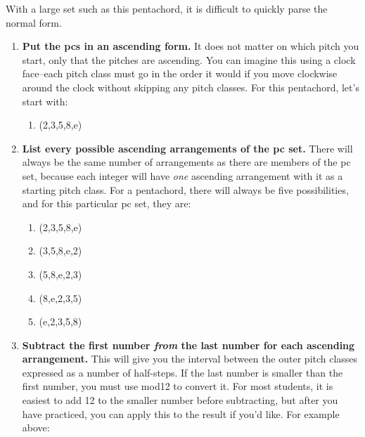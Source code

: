 \documentclass{book}
\providecommand{\tightlist}{%
  \setlength{\itemsep}{0pt}\setlength{\parskip}{0pt}}
\begin{document}
With a large set such as this pentachord, it is difficult to quickly parse the
normal form.

\begin{enumerate}
\def\labelenumi{\arabic{enumi}.}
\tightlist
\item
  \textbf{Put the pcs in an ascending form.} It does not matter on which pitch
  you start, only that the pitches are ascending. You can imagine this using a
  clock face--each pitch class must go in the order it would if you move
  clockwise around the clock without skipping any pitch classes. For this
  pentachord, let's start with:

  \begin{enumerate}
  \def\labelenumii{\arabic{enumii}.}
  \tightlist
  \item
    (2,3,5,8,e)
  \end{enumerate}
\item
  \textbf{List every possible ascending arrangements of the pc set.} There
  will always be the same number of arrangements as there are members of the
  pc set, because each integer will have \emph{one} ascending arrangement with
  it as a starting pitch class. For a pentachord, there will always be five
  possibilities, and for this particular pc set, they are:

  \begin{enumerate}
  \def\labelenumii{\arabic{enumii}.}
  \tightlist
  \item
    (2,3,5,8,e)
  \item
    (3,5,8,e,2)
  \item
    (5,8,e,2,3)
  \item
    (8,e,2,3,5)
  \item
    (e,2,3,5,8)
  \end{enumerate}
\item
  \textbf{Subtract the first number \emph{from} the last number for each
  ascending arrangement.} This will give you the interval between the outer
  pitch classes expressed as a number of half-steps. If the last number is
  smaller than the first number, you must use mod12 to convert it. For most
  students, it is easiest to add 12 to the smaller number before subtracting,
  but after you have practiced, you can apply this to the result if you'd
  like. For example above:


\end{enumerate}
\end{document}
